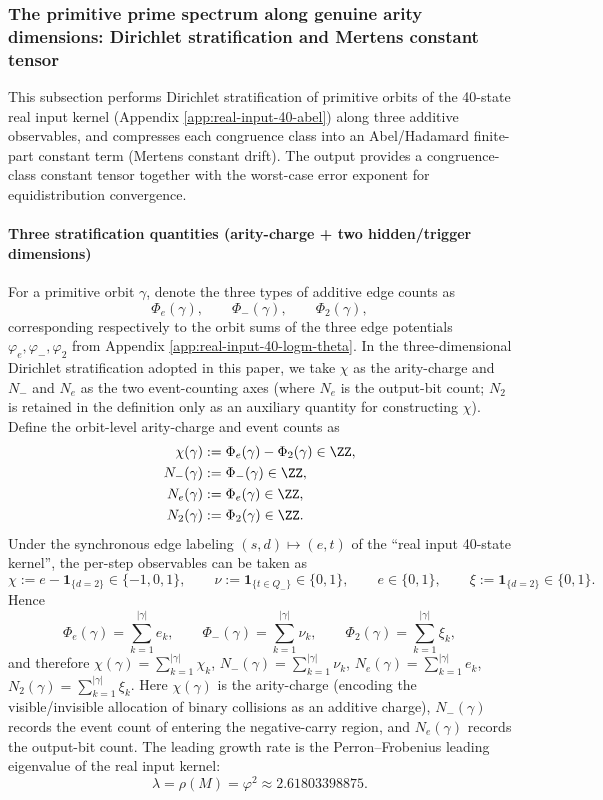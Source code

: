 \subsubsection{The primitive prime spectrum along genuine arity dimensions: Dirichlet stratification and Mertens constant tensor}\label{subsec:arity-dirichlet-mertens-tensor}
This subsection performs Dirichlet stratification of primitive orbits of the 40-state real input kernel (Appendix \ref{app:real-input-40-abel}) along three additive observables, and compresses each congruence class into an Abel/Hadamard finite-part constant term (Mertens constant drift). The output provides a congruence-class constant tensor together with the worst-case error exponent for equidistribution convergence.

\paragraph{Three stratification quantities (arity-charge + two hidden/trigger dimensions)}
For a primitive orbit $\gamma$, denote the three types of additive edge counts as
$$
\Phi_e(\gamma),\qquad \Phi_-(\gamma),\qquad \Phi_2(\gamma),
$$
corresponding respectively to the orbit sums of the three edge potentials $\varphi_e,\varphi_-,\varphi_2$ from Appendix \ref{app:real-input-40-logm-theta}.
In the three-dimensional Dirichlet stratification adopted in this paper, we take $\chi$ as the arity-charge and $N_-$ and $N_e$ as the two event-counting axes (where $N_e$ is the output-bit count; $N_2$ is retained in the definition only as an auxiliary quantity for constructing $\chi$).
Define the orbit-level arity-charge and event counts as
\[
\begin{aligned}
\chi(\gamma)&:=\Phi_e(\gamma)-\Phi_2(\gamma)\in\ZZ,\\
N_-(\gamma)&:=\Phi_-(\gamma)\in\ZZ,\\
N_e(\gamma)&:=\Phi_e(\gamma)\in\ZZ,\\
N_2(\gamma)&:=\Phi_2(\gamma)\in\ZZ.
\end{aligned}
\]
Under the synchronous edge labeling $(s,d)\mapsto(e,t)$ of the ``real input 40-state kernel'', the per-step observables can be taken as
$$
\chi:=e-\mathbf{1}_{\{d=2\}}\in\{-1,0,1\},
\qquad
\nu:=\mathbf{1}_{\{t\in Q_-\}}\in\{0,1\},
\qquad
e\in\{0,1\},
\qquad
\xi:=\mathbf{1}_{\{d=2\}}\in\{0,1\}.
$$
Hence
$$
\Phi_e(\gamma)=\sum_{k=1}^{|\gamma|} e_k,
\qquad
\Phi_-(\gamma)=\sum_{k=1}^{|\gamma|} \nu_k,
\qquad
\Phi_2(\gamma)=\sum_{k=1}^{|\gamma|} \xi_k,
$$
and therefore $\chi(\gamma)=\sum_{k=1}^{|\gamma|}\chi_k$, $N_-(\gamma)=\sum_{k=1}^{|\gamma|}\nu_k$, $N_e(\gamma)=\sum_{k=1}^{|\gamma|}e_k$, $N_2(\gamma)=\sum_{k=1}^{|\gamma|}\xi_k$.
Here $\chi(\gamma)$ is the arity-charge (encoding the visible/invisible allocation of binary collisions as an additive charge), $N_-(\gamma)$ records the event count of entering the negative-carry region, and $N_e(\gamma)$ records the output-bit count. The leading growth rate is the Perron--Frobenius leading eigenvalue of the real input kernel:
$$
\lambda=\rho(M)=\varphi^2\approx 2.61803398875.
$$

